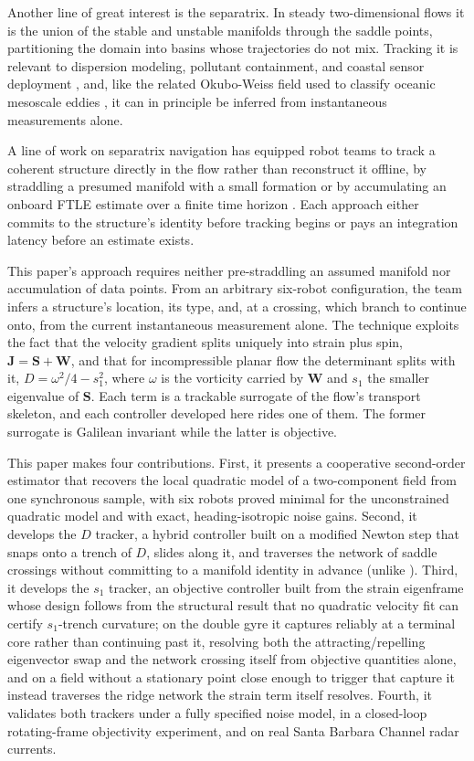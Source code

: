 \documentclass[lettersize,journal]{IEEEtran}
\begin{document}
Another line of great interest is the separatrix. In steady
two-dimensional flows it is the union of the stable and unstable
manifolds through the saddle points, partitioning the domain into
basins whose trajectories do not mix. Tracking it is relevant to
dispersion modeling, pollutant containment, and coastal sensor
deployment \cite{6,7,8}, and, like the related Okubo-Weiss field used
to classify oceanic mesoscale eddies \cite{5}, it can in principle be
inferred from instantaneous measurements alone.

A line of work on separatrix navigation has equipped robot teams to
track a coherent structure directly in the flow rather than
reconstruct it offline, by straddling a presumed manifold with a small
formation \cite{9,10,11,12} or by accumulating an onboard FTLE
estimate over a finite time horizon \cite{13}. Each approach either
commits to the structure's identity before tracking begins or pays an
integration latency before an estimate exists.

This paper's approach requires neither pre-straddling an assumed
manifold nor accumulation of data points. From an arbitrary six-robot
configuration, the team infers a structure's location, its type, and,
at a crossing, which branch to continue onto, from the current
instantaneous measurement alone. The technique exploits the fact that
the velocity gradient splits uniquely into strain plus spin,
$\mathbf{J} = \mathbf{S} + \mathbf{W}$, and that for incompressible
planar flow the determinant splits with it, $D = \omega^2/4 - s_1^2$,
where $\omega$ is the vorticity carried by $\mathbf{W}$ and $s_1$ the
smaller eigenvalue of $\mathbf{S}$.
Each term is a trackable surrogate of the flow's transport skeleton,
and each controller developed here rides one of them. The former surrogate 
is Galilean invariant while the latter is objective.

This paper makes four contributions. First, it presents a cooperative
second-order estimator that recovers the local quadratic model of a
two-component field from one synchronous sample, with six robots proved
minimal for the unconstrained quadratic model and with exact,
heading-isotropic noise gains. Second, it
develops the $D$ tracker, a hybrid controller built on a modified
Newton step that snaps onto a trench of $D$, slides along it, and
traverses the network of saddle crossings without committing to a
manifold identity in advance (unlike \cite{9,10}). Third, it develops the
$s_1$ tracker, an objective controller built from the strain
eigenframe whose design follows from the structural result that no
quadratic velocity fit can certify $s_1$-trench curvature; on the
double gyre it captures reliably at a terminal core rather than
continuing past it, resolving both the attracting/repelling eigenvector
swap and the network crossing itself from objective quantities alone,
and on a field without a stationary point close enough to trigger that
capture it instead traverses the ridge network the strain term itself
resolves. Fourth, it validates both trackers under a fully specified
noise model, in a closed-loop rotating-frame objectivity experiment,
and on real Santa Barbara Channel radar currents.
\end{document}
